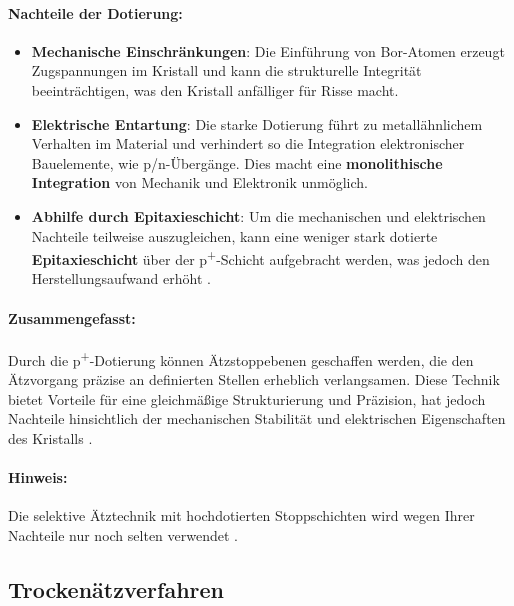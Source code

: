 \documentclass{article} %
\begin{document}
\paragraph{Nachteile der Dotierung:}
\begin{itemize}
    \item \textbf{Mechanische Einschränkungen}: Die Einführung von Bor-Atomen erzeugt Zugspannungen im Kristall und kann die strukturelle Integrität beeinträchtigen, was den Kristall anfälliger für Risse macht.
    \item \textbf{Elektrische Entartung}: Die starke Dotierung führt zu metallähnlichem Verhalten im Material und verhindert so die Integration elektronischer Bauelemente, wie p/n-Übergänge. Dies macht eine \textbf{monolithische Integration} von Mechanik und Elektronik unmöglich.
    \item \textbf{Abhilfe durch Epitaxieschicht}: Um die mechanischen und elektrischen Nachteile teilweise auszugleichen, kann eine weniger stark dotierte \textbf{Epitaxieschicht} über der p\textsuperscript{+}-Schicht aufgebracht werden, was jedoch den Herstellungsaufwand erhöht \cite{seidel1990, kittel2004}.
\end{itemize}

\paragraph{Zusammengefasst:} Durch die p\textsuperscript{+}-Dotierung können Ätzstoppebenen geschaffen werden, die den Ätzvorgang präzise an definierten Stellen erheblich verlangsamen. Diese Technik bietet Vorteile für eine gleichmäßige Strukturierung und Präzision, hat jedoch Nachteile hinsichtlich der mechanischen Stabilität und elektrischen Eigenschaften des Kristalls \cite{madou2002, kittel2004}.

\paragraph{Hinweis:} Die selektive Ätztechnik mit hochdotierten Stoppschichten wird wegen Ihrer Nachteile nur noch selten verwendet \cite{schmid2024Aetzen}.





\subsection{Trockenätzverfahren}
\end{document}
